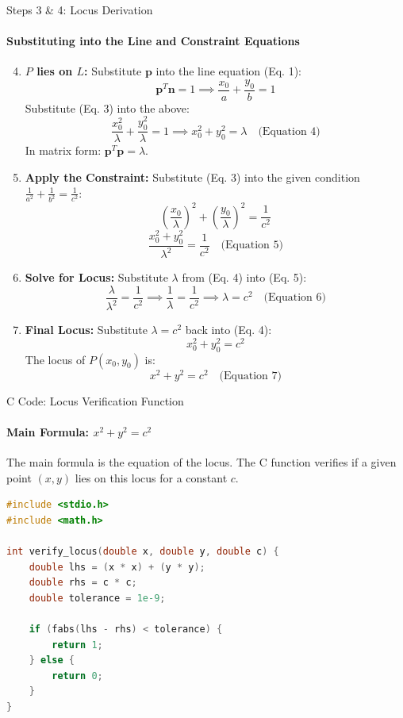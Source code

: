 \documentclass{beamer}
\begin{document}
\begin{frame}{Steps 3 \& 4: Locus Derivation}
    \framesubtitle{Substituting into the Line and Constraint Equations}
    
    \begin{enumerate}
        \setcounter{enumi}{3}
        \item \textbf{$P$ lies on $L$:} Substitute $\mathbf{p}$ into the line equation (Eq. 1):
        $$\mathbf{p}^T \mathbf{n} = 1 \implies \frac{x_0}{a} + \frac{y_0}{b} = 1$$
        Substitute (Eq. 3) into the above:
        $$\frac{x_0^2}{\lambda} + \frac{y_0^2}{\lambda} = 1 \implies x_0^2 + y_0^2 = \lambda \quad \text{(Equation 4)}$$
        In matrix form: $\mathbf{p}^T \mathbf{p} = \lambda$.
        
        \item \textbf{Apply the Constraint:} Substitute (Eq. 3) into the given condition $\frac{1}{a^2} + \frac{1}{b^2} = \frac{1}{c^2}$:
        $$\left(\frac{x_0}{\lambda}\right)^2 + \left(\frac{y_0}{\lambda}\right)^2 = \frac{1}{c^2}$$
        $$\frac{x_0^2 + y_0^2}{\lambda^2} = \frac{1}{c^2} \quad \text{(Equation 5)}$$
        
        \item \textbf{Solve for Locus:} Substitute $\lambda$ from (Eq. 4) into (Eq. 5):
        $$\frac{\lambda}{\lambda^2} = \frac{1}{c^2} \implies \frac{1}{\lambda} = \frac{1}{c^2} \implies \lambda = c^2 \quad \text{(Equation 6)}$$
        
        \item \textbf{Final Locus:} Substitute $\lambda = c^2$ back into (Eq. 4):
        $$x_0^2 + y_0^2 = c^2$$
        The locus of $P(x_0, y_0)$ is:
        $$x^2 + y^2 = c^2 \quad \text{(Equation 7)}$$
    \end{enumerate}
\end{frame}

\begin{frame}[fragile]{C Code: Locus Verification Function}
    \framesubtitle{Main Formula: $x^2 + y^2 = c^2$}
    
    The main formula is the equation of the locus. The C function verifies if a given point $(x, y)$ lies on this locus for a constant $c$.
    
    \lstset{style=CStyle}
    \begin{lstlisting}[language=C]
#include <stdio.h>
#include <math.h>

int verify_locus(double x, double y, double c) {
    double lhs = (x * x) + (y * y);
    double rhs = c * c;
    double tolerance = 1e-9; 
    
    if (fabs(lhs - rhs) < tolerance) {
        return 1;
    } else {
        return 0;
    }
}
    \end{lstlisting}
\end{frame}
\end{document}
